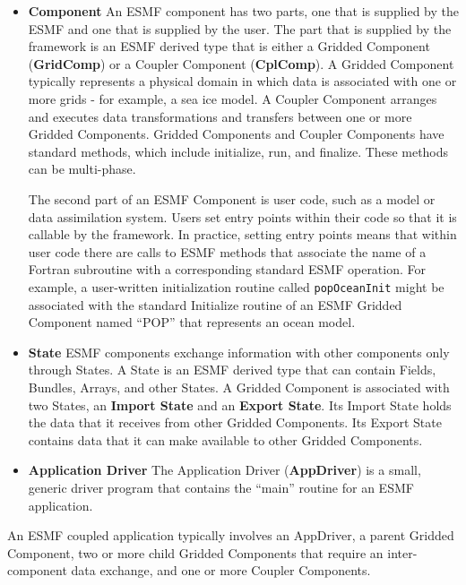 \begin{itemize}
\item {\bf Component}  An ESMF component has two parts, one that is 
supplied by the ESMF and one that is supplied by the user.  The
part that is supplied by the framework is an ESMF derived type that
is either a Gridded Component ({\bf GridComp}) or a Coupler 
Component ({\bf CplComp}).  A Gridded Component typically represents
a physical domain in which data is associated with one or more 
grids - for example, a sea ice model.  A Coupler Component 
arranges and executes data transformations and transfers between
one or more Gridded Components. Gridded Components and Coupler 
Components have standard methods, which include initialize, run,
and finalize.  These methods can be multi-phase.

The second part of an ESMF Component is user code, such as a
model or data assimilation system.  Users set entry points 
within their code so that it is callable by the framework.  
In practice, setting entry points means that within user code 
there are calls to ESMF methods that associate the name of a 
Fortran subroutine with a corresponding standard ESMF operation.  
For example, a user-written initialization routine called 
{\tt popOceanInit} might be associated with the standard 
Initialize routine of an ESMF Gridded Component named ``POP'' 
that represents an ocean model.

\item {\bf State}  ESMF components exchange information with other 
components only through States.  A State is an ESMF derived
type that can contain Fields, Bundles, Arrays, and other
States.  A Gridded Component  is associated with two States, an 
{\bf Import State} and an {\bf Export State}.  Its Import State 
holds the data that it receives from other Gridded Components.  
Its Export State contains data that it can make available to 
other Gridded Components. 

\item {\bf Application Driver} The Application Driver ({\bf AppDriver}) 
is a small, generic driver program that contains the ``main'' 
routine for an ESMF application.

\end{itemize}

An ESMF coupled application typically involves an AppDriver, a parent 
Gridded Component, two or more child Gridded Components that require 
an inter-component data exchange, and one or more Coupler 
Components. 

